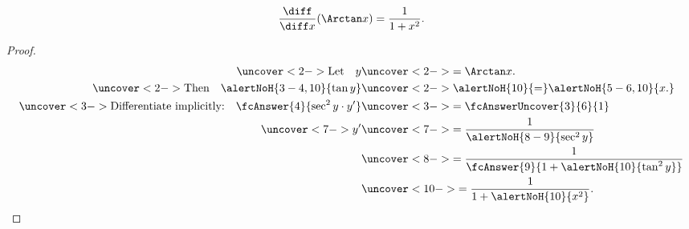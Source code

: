 \begin{frame}
\begin{theorem}
\[
\frac{\diff}{\diff x} (\Arctan x) = \frac{1}{1 + x^2}.
\]
\end{theorem}
\begin{proof}
\abovedisplayskip=0pt
\belowdisplayskip=-15pt
\abovedisplayshortskip=0pt
\belowdisplayshortskip=0pt
\begin{align*}
\uncover<2->{%
\text{Let}\quad y %
}%
& \uncover<2->{%
 = \Arctan x.
}\\%
\uncover<2->{%
\text{Then}\quad \alertNoH{ 3-4,10}{\tan y} %
}%
& \uncover<2->{%
 \alertNoH{ 10}{=}  \alertNoH{ 5-6,10}{x.} %
}\\%
\uncover<3->{%
\text{Differentiate implicitly:}\quad \fcAnswer{4}{\sec^2 y \cdot y'} %
}%
& \uncover<3->{ = \fcAnswerUncover{3}{6}{1}} \\%
\uncover<7->{y'}%
& \uncover<7->{%
 = \frac{1}{\alertNoH{ 8-9}{\sec^2 y}} %
}\\%
& \uncover<8->{ = \frac{1}{\fcAnswer{9}{1+\alertNoH{ 10}{\tan^2 y}}}}\\%
& \uncover<10->{ = \frac{1}{1+\alertNoH{ 10}{x^2}}. \qedhere}%
\end{align*}
\end{proof}
\end{frame}
